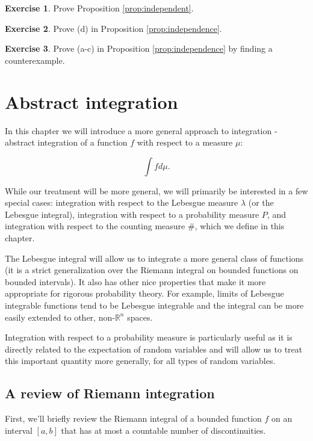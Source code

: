 \documentclass{book}
\theoremstyle{plain}%
\theoremstyle{definition}
\newtheorem{exercise}{Exercise}[chapter]
\begin{document}
\begin{exercise}
Prove Proposition \ref{prop:independent}.
\end{exercise}

\begin{exercise}
Prove (d) in Proposition \ref{prop:independence}.
\end{exercise}

\begin{exercise}
Prove (a-c) in Proposition \ref{prop:independence} by finding a counterexample.
\end{exercise}


\chapter{Abstract integration}\label{ch:abstract}

In this chapter we will introduce a more general approach to integration - abstract integration of a function $f$ with respect to a measure $\mu$:

$$\int f d\mu.$$

While our treatment will be more general, we will primarily be interested in a few special cases: integration with respect to the Lebesgue measure $\lambda$ (or the Lebesgue integral), integration with respect to a probability measure $P$, and integration with respect to the counting measure $\#$, which we define in this chapter.

The Lebesgue integral will allow us to integrate a more general class of functions (it is a strict generalization over the Riemann integral on bounded functions on bounded intervals). It also has other nice properties that make it more appropriate for rigorous probability theory. For example, limits of Lebesgue integrable functions tend to be Lebesgue integrable and the integral can be more easily extended to other, non-$\mathbb{R}^n$ spaces.

Integration with respect to a probability measure is particularly useful as it is directly related to the expectation of random variables and will allow us to treat this important quantity more generally, for all types of random variables.

\section{A review of Riemann integration}

First, we'll briefly review the Riemann integral of a bounded function $f$ on an interval $[a,b]$ that has at most a countable number of discontinuities.
\end{document}
